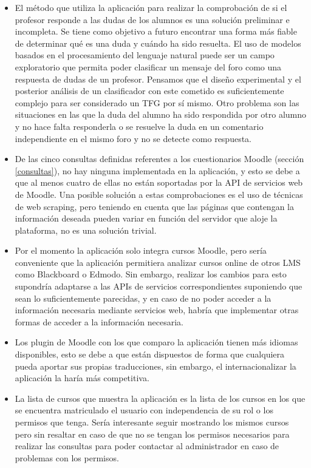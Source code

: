 \begin{itemize}
	\item
	El método que utiliza la aplicación para realizar la comprobación de si el profesor responde a las dudas de los alumnos es una solución preliminar e incompleta. Se tiene como objetivo a futuro encontrar una forma más fiable de determinar qué es una duda y cuándo ha sido resuelta.
	El uso de modelos basados en el procesamiento del lenguaje natural puede ser un campo exploratorio que permita poder clasificar un mensaje del foro como una respuesta de dudas de un profesor. Pensamos que el diseño experimental y el posterior análisis de un clasificador con este cometido es suficientemente complejo para ser considerado un TFG por sí mismo. Otro problema son las situaciones en las que la duda del alumno ha sido respondida por otro alumno y no hace falta responderla o se resuelve la duda en un comentario independiente en el mismo foro y no se detecte como respuesta.
	\item
	De las cinco consultas definidas referentes a los cuestionarios Moodle (sección \ref{consultas}), no hay ninguna implementada en la aplicación, y esto se debe a que al menos cuatro de ellas no están soportadas por la API de servicios web de Moodle.
	Una posible solución a estas comprobaciones es el uso de técnicas de web scraping, pero teniendo en cuenta que las páginas que contengan la información deseada pueden variar en función del servidor que aloje la plataforma, no es una solución trivial.
	\item
	Por el momento la aplicación solo integra cursos Moodle, pero sería conveniente que la aplicación permitiera analizar cursos online de otros LMS como Blackboard o Edmodo. Sin embargo, realizar los cambios para esto supondría adaptarse a las APIs de servicios correspondientes suponiendo que sean lo suficientemente parecidas, y en caso de no poder acceder a la información necesaria mediante servicios web, habría que implementar otras formas de acceder a la información necesaria.
	\item
	Los plugin de Moodle con los que comparo la aplicación tienen más idiomas disponibles, esto se debe a que están dispuestos de forma que cualquiera pueda aportar sus propias traducciones, sin embargo, el internacionalizar la aplicación la haría más competitiva.
	\item
	La lista de cursos que muestra la aplicación es la lista de los cursos en los que se encuentra matriculado el usuario con independencia de su rol o los permisos que tenga. Sería interesante seguir mostrando los mismos cursos pero sin resaltar en caso de que no se tengan los permisos necesarios para realizar las consultas para poder contactar al administrador en caso de problemas con los permisos.

\end{itemize}
